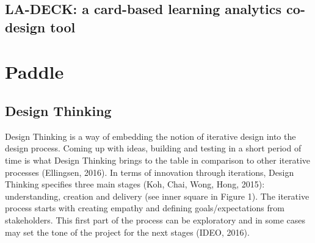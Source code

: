 \documentclass[preprint,12pt]{elsarticle}
\begin{document}
\subsection{LA-DECK: a card-based learning analytics co-design tool \cite{Alvarez2020}}
\subsection{\citet{prestigiacomo2020learning}}
\subsection{\citet{prestigiacomo2020data}}
\subsection{\citet{prestigiacomo2020learning}}
\subsection{\citet{prestigiacomo2020learning}}
\subsection{\citet{prestigiacomo2020learning}}
\subsection{\citet{prestigiacomo2020learning}}


\section{Paddle}
\subsection{Design Thinking}
Design Thinking is a way of embedding the notion of iterative design into the
design process. Coming up with ideas, building and testing in a short period of time is
what Design Thinking brings to the table in comparison to other iterative processes
(Ellingsen, 2016). In terms of innovation through iterations, Design Thinking specifies
three main stages (Koh, Chai, Wong,  Hong, 2015): understanding, creation and
delivery (see inner square in Figure 1). The iterative process starts with creating
empathy and defining goals/expectations from stakeholders. This first part of the
process can be exploratory and in some cases may set the tone of the project for the
next stages (IDEO, 2016). 
\end{document}
